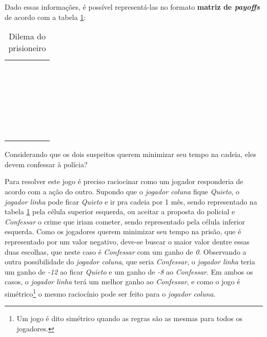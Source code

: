 Dado essas informações, é possível representá-las no formato {\bfseries matriz de \emph{payoffs}} de acordo com a tabela \ref{tab:dilema-prisioneiro}:

\begin{table}[ht]
\centering
\begin{tabular}{|c|c|c|c|}
	\cline{3-4}
	\multicolumn{1}{c}{} &  & \multicolumn{2}{c|}{\color{red}{\bfseries Coluna}}\tabularnewline
	\cline{3-4}
	\multicolumn{1}{c}{} &  & \color{red}{\scshape Quieto}\  & \color{red}{\scshape Confessa}\ \tabularnewline
	\hline
	\multirow{2}{*}{\begin{turn}{90}
	\color{blue}{\bfseries Linha}
	\end{turn}} & \begin{turn}{90}
	\color{blue}{\scshape Quieto}\
	\end{turn} & \color{black}{\Large(}\color{blue}{\Large -1}\color{black}{\Large,}\color{red}{\Large -1}\color{black}{\Large)} & \color{black}{\Large(}\color{blue}{\Large -12}\color{black}{\Large,}\color{red}{\Large 0}\color{black}{\Large)}\tabularnewline
	\cline{2-4}
	 & \begin{turn}{90}
	\color{blue}{\scshape Confessa}\
	\end{turn} & \color{black}{\Large(}\color{blue}{\Large 0}\color{black}{\Large,}\color{red}{\Large -12}\color{black}{\Large)} & \color{black}{\Large(}\color{blue}{\Large -8}\color{black}{\Large,}\color{red}{\Large -8}\color{black}{\Large)}\tabularnewline
	\hline
\end{tabular}
\caption{Dilema do prisioneiro}
\label{tab:dilema-prisioneiro}
\end{table}

Considerando que os dois suspeitos querem minimizar seu tempo na cadeia, eles devem confessar à polícia?

Para resolver este jogo é preciso raciocinar como um jogador responderia de acordo com a ação do outro. Supondo que o \emph{\color{red}jogador coluna} fique \emph{\color{red}Quieto}, o \emph{\color{blue}jogador linha} pode ficar \emph{\color{blue}Quieto} e ir pra cadeia por 1 mês, sendo representado na tabela \ref{tab:dilema-prisioneiro} pela célula superior esquerda, ou aceitar a proposta do policial e \emph{\color{blue}Confessar} o crime que iriam cometer, sendo representado pela célula inferior esquerda. Como os jogadores querem minimizar seu tempo na prisão, que é representado por um valor negativo, deve-se buscar o maior valor dentre essas duas escolhas, que neste caso é \emph{\color{blue}Confessar} com um ganho de \emph{\color{blue}0}. Observando a outra possibilidade do \emph{\color{red}jogador coluna}, que seria \emph{\color{red}Confessar}, o \emph{\color{blue}jogador linha} teria um ganho de \emph{\color{blue}-12} ao ficar \emph{\color{blue}Quieto} e um ganho de \emph{\color{blue}-8} ao \emph{\color{blue}Confessar}. Em ambos os casos, o \emph{\color{blue}jogador linha} terá um melhor ganho ao \emph{\color{blue}Confessar}, e como o jogo é simétrico\footnote{Um jogo é dito simétrico quando as regras são as mesmas para todos os jogadores.} o mesmo raciocínio pode ser feito para o \emph{\color{red}jogador coluna}.

